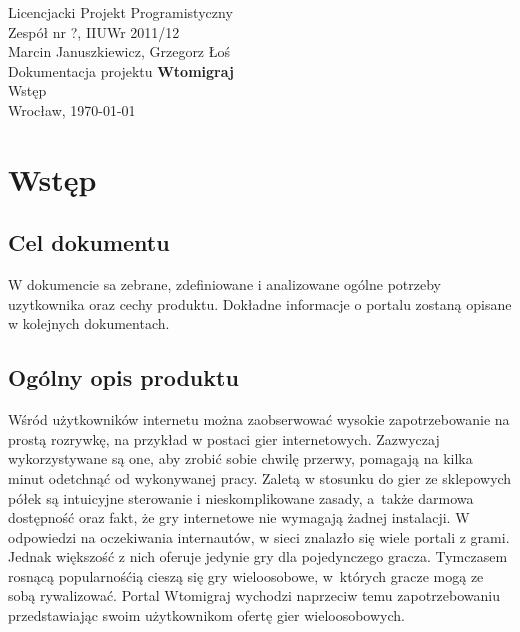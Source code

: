 \documentclass[11pt,leqno]{article}
\begin{document}
\begin{center}
\thispagestyle{empty}
{\Large Licencjacki Projekt Programistyczny}\\[0.5cm]
{\Large Zespół nr ?, IIUWr 2011/12}\\[2.5cm]

{\large Marcin Januszkiewicz, Grzegorz Łoś}\\[0.5cm]
{\huge Dokumentacja projektu \textbf{Wtomigraj}}\\[0.5cm]
{\huge Wstęp}\\[0.5cm]
\vfill
{\large Wrocław, \today}
\end{center}
\newpage
\tableofcontents

\newpage


\newpage
\section{Wstęp}

\subsection{Cel dokumentu}
\noindent
W dokumencie sa zebrane, zdefiniowane i analizowane ogólne potrzeby uzytkownika oraz cechy produktu. Dokładne informacje o portalu zostaną opisane w kolejnych dokumentach. 

\subsection{Ogólny opis produktu}
\noindent
Wśród użytkowników internetu można zaobserwować wysokie zapotrzebowanie na prostą rozrywkę, na przykład w postaci gier internetowych. Zazwyczaj wykorzystywane są one, aby zrobić sobie chwilę przerwy, pomagają na kilka minut odetchnąć od wykonywanej pracy. Zaletą w stosunku do gier ze sklepowych półek są intuicyjne sterowanie i nieskomplikowane zasady, a~także darmowa dostępność oraz fakt, że gry internetowe nie wymagają żadnej instalacji. W odpowiedzi na oczekiwania internautów, w sieci znalazło się wiele portali z grami. Jednak większość z nich oferuje jedynie gry dla pojedynczego gracza. Tymczasem rosnącą popularnośćią cieszą się gry wieloosobowe, w~których gracze mogą ze sobą rywalizować. Portal Wtomigraj wychodzi naprzeciw temu zapotrzebowaniu przedstawiając swoim użytkownikom ofertę gier wieloosobowych. 
\end{document}
